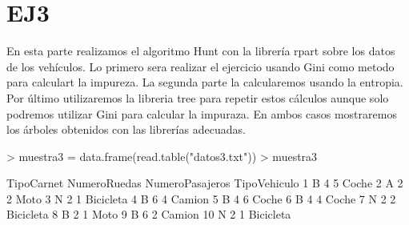 \documentclass [a4paper] {article}
\begin{document}
\section{EJ3}
En esta parte realizamos el algoritmo Hunt con la librería rpart sobre los datos de los vehículos.
Lo primero sera realizar el ejercicio usando Gini como metodo para calculart la impureza.
La segunda parte la calcularemos usando la entropia. 
Por último utilizaremos la libreria tree para repetir estos cálculos aunque solo podremos utilizar Gini para calcular la impuraza.
En ambos casos mostraremos los árboles obtenidos con las librerías adecuadas.
\begin{Schunk}
\begin{Sinput}
> muestra3 = data.frame(read.table("datos3.txt"))
> muestra3
\end{Sinput}
\begin{Soutput}
   TipoCarnet NumeroRuedas NumeroPasajeros TipoVehiculo
1           B            4               5        Coche
2           A            2               2         Moto
3           N            2               1    Bicicleta
4           B            6               4       Camion
5           B            4               6        Coche
6           B            4               4        Coche
7           N            2               2    Bicicleta
8           B            2               1         Moto
9           B            6               2       Camion
10          N            2               1    Bicicleta
\end{Soutput}
\end{Schunk}

\newpage
\end{document}
